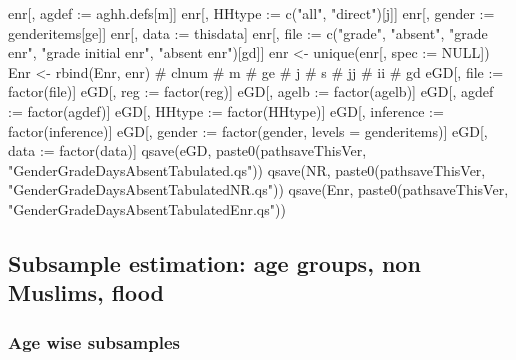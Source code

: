 \begin{Schunk}
\begin{Sinput}
{{{{{{{{                enr[, agdef := aghh.defs[m]]
                enr[, HHtype := c("all", "direct")[j]]
                enr[, gender := genderitems[ge]]
                enr[, data := thisdata]
                enr[, file := c("grade", "absent", "grade enr", "grade initial enr", "absent enr")[gd]]
                enr <- unique(enr[, spec := NULL])
                Enr <- rbind(Enr, enr)
              } # clnum
            } # m
          } # ge
        } # j
      } # s
    } # jj
  } # ii
} # gd
eGD[, file := factor(file)]
eGD[, reg := factor(reg)]
eGD[, agelb := factor(agelb)]
eGD[, agdef := factor(agdef)]
eGD[, HHtype := factor(HHtype)]
eGD[, inference := factor(inference)]
eGD[, gender := factor(gender, levels = genderitems)]
eGD[, data := factor(data)]
qsave(eGD, paste0(pathsaveThisVer, "GenderGradeDaysAbsentTabulated.qs"))
qsave(NR, paste0(pathsaveThisVer, "GenderGradeDaysAbsentTabulatedNR.qs"))
qsave(Enr, paste0(pathsaveThisVer, "GenderGradeDaysAbsentTabulatedEnr.qs"))
\end{Sinput}
\end{Schunk}





\subsection{Subsample estimation: age groups, non Muslims, flood}



\subsubsection{Age wise subsamples}


